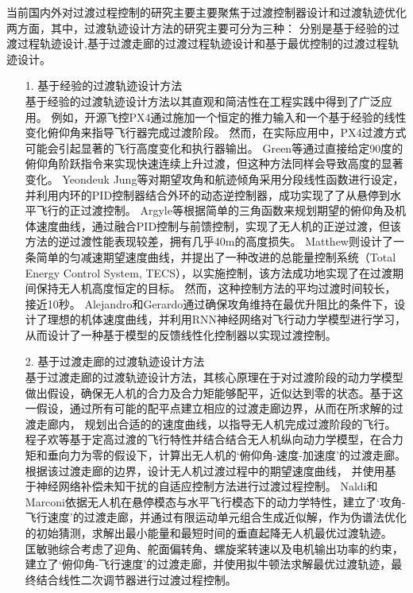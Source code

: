 当前国内外对过渡过程控制的研究主要主要聚焦于过渡控制器设计和过渡轨迹优化两方面，其中，过渡轨迹设计方法的研究主要可分为三种：
分别是基于经验的过渡过程轨迹设计,基于过渡走廊的过渡过程轨迹设计和基于最优控制的过渡过程轨迹设计\cite{1018875946.nh}。
\begin{itemize}

    \item [1.] 基于经验的过渡轨迹设计方法\\

    基于经验的过渡轨迹设计方法以其直观和简洁性在工程实践中得到了广泛应用。
    例如，开源飞控PX4通过施加一个恒定的推力输入和一个基于经验的线性变化俯仰角来指导飞行器完成过渡阶段\cite{meier2015px4}。
    然而，在实际应用中，PX4过渡方式可能会引起显著的飞行高度变化和执行器输出。
    Green等通过直接给定90度的俯仰角阶跃指令来实现快速连续上升过渡，但这种方法同样会导致高度的显著变化\cite{green2005mav}。
    Yeondeuk Jung等对期望攻角和航迹倾角采用分段线性函数进行设定，并利用内环的PID控制器结合外环的动态逆控制器，成功实现了了从悬停到水平飞行的正过渡控制\cite{jeong2010transition}。
    Argyle等根据简单的三角函数来规划期望的俯仰角及机体速度曲线，通过融合PID控制与前馈控制，实现了无人机的正逆过渡，但该方法的逆过渡性能表现较差，拥有几乎40m的高度损失\cite{argyle2013vertical}。
    Matthew则设计了一条简单的匀减速期望速度曲线，并提出了一种改进的总能量控制系统（Total Energy Control System, TECS），以实施控制，该方法成功地实现了在过渡期间保持无人机高度恒定的目标。
    然而，这种控制方法的平均过渡时间较长，接近10秒\cite{argyle2016modeling}。
    Alejandro和Gerardo通过确保攻角维持在最优升阻比的条件下，设计了理想的机体速度曲线，并利用RNN神经网络对飞行动力学模型进行学习，从而设计了一种基于模型的反馈线性化控制器以实现过渡控制\cite{flores2020transition}。
    
    \item [2.] 基于过渡走廊的过渡轨迹设计方法\\

    基于过渡走廊的过渡轨迹设计方法，其核心原理在于对过渡阶段的动力学模型做出假设，确保无人机的合力及合力矩能够配平，近似达到零的状态。基于这一假设，通过所有可能的配平点建立相应的过渡走廊边界，从而在所求解的过渡走廊内，
    规划出合适的的速度曲线，以指导无人机完成过渡阶段的飞行。
    程子欢等基于定高过渡的飞行特性并结合结合无人机纵向动力学模型，在合力矩和垂向力为零的假设下，计算出无人机的‘俯仰角-速度-加速度’的过渡走廊。根据该过渡走廊的边界，设计无人机过渡过程中的期望速度曲线，
    并使用基于神经网络补偿未知干扰的自适应控制方法进行过渡过程控制\cite{cheng2022transition,cheng2020neural}。
    Naldi和Marconi依据无人机在悬停模态与水平飞行模态下的动力学特性，建立了‘攻角-飞行速度’的过渡走廊，并通过有限运动单元组合生成近似解，作为伪谱法优化的初始猜测，求解出最小能量和最短时间的垂直起降无人机最优过渡轨迹\cite{naldi2011optimal}。
    匡敏驰综合考虑了迎角、舵面偏转角、螺旋桨转速以及电机输出功率的约束，建立了‘俯仰角-飞行速度’的过渡走廊，并使用拟牛顿法求解最优过渡轨迹，最终结合线性二次调节器进行过渡过程控制\cite{1018875946.nh}。
    

\end{itemize}
